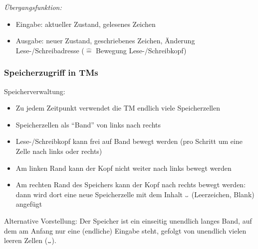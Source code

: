\documentclass[onlymath]{beamer}
\begin{document}
\begin{frame}
\emph{Übergangsfunktion:}
\begin{itemize}
\item \alert{Eingabe:} aktueller Zustand, gelesenes Zeichen
\item \alert{Ausgabe:} neuer Zustand, geschriebenes Zeichen, Änderung Lese-/Schreibadresse (${}\hat{=}{}$ Bewegung Lese-/Schreibkopf)
\end{itemize}

\end{frame}

\begin{frame}\frametitle{Speicherzugriff in TMs}


\alert{Speicherverwaltung:}
\begin{itemize}
\item Zu jedem Zeitpunkt verwendet die TM endlich viele Speicherzellen
\item Speicherzellen als "`Band"' von links nach rechts
\item Lese-/Schreibkopf kann frei auf Band bewegt werden (pro Schritt um eine Zelle nach links oder rechts)
\item Am linken Rand kann der Kopf nicht weiter nach links bewegt werden
\item Am rechten Rand des Speichers kann der Kopf nach rechts bewegt werden: dann wird dort eine neue Speicherzelle mit dem Inhalt $\blank$ (Leerzeichen, Blank) angefügt
\end{itemize}

\alert{Alternative Vorstellung:} Der Speicher ist ein einseitig unendlich langes Band, auf dem am Anfang nur
eine (endliche) Eingabe steht, gefolgt von unendlich vielen leeren Zellen ($\blank$).

\end{frame}

\begin{frame}
\end{frame}
\end{document}
